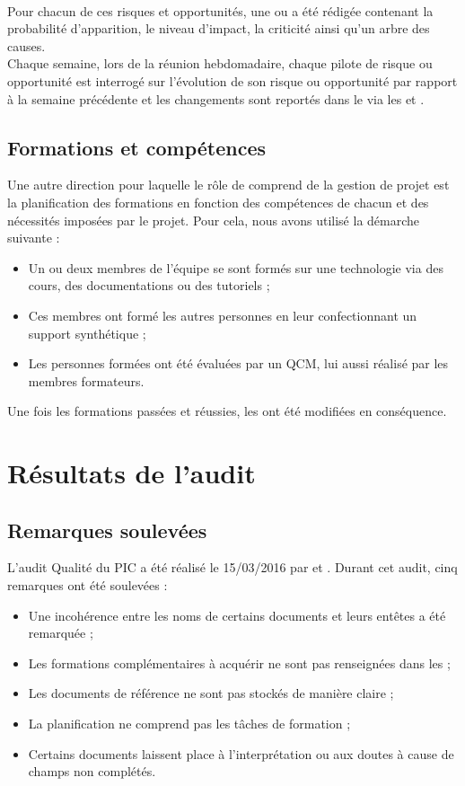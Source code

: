 \documentclass[asi]{picInsa}
\begin{document}
~\\
\indent Pour chacun de ces risques et opportunités, une \FDR{} ou \FDO{} a été rédigée contenant la probabilité d'apparition, le niveau d'impact, la criticité ainsi qu'un arbre des causes. \\
\indent Chaque semaine, lors de la réunion hebdomadaire, chaque pilote de risque ou opportunité est interrogé sur l'évolution de son risque ou opportunité par rapport à la semaine précédente et les changements sont reportés dans le \PRO{} via les \FDR{} et \FDO{}.

\section{Formations et compétences}
Une autre direction pour laquelle le rôle de \RQ{} comprend de la gestion de projet est la planification des formations en fonction des compétences de chacun et des nécessités imposées par le projet. Pour cela, nous avons utilisé la démarche suivante :
\begin{itemize}
\item Un ou deux membres de l’équipe se sont formés sur une technologie via des cours, des documentations ou des tutoriels ;
\item Ces membres ont formé les autres personnes en leur confectionnant un support synthétique ;
\item Les personnes formées ont été évaluées par un QCM, lui aussi réalisé par les membres formateurs.
\end{itemize}
Une fois les formations passées et réussies, les \FC{} ont été modifiées en conséquence.


\chapter{Résultats de l'audit}
\label{Resultats}

\section{Remarques soulevées}
L’audit Qualité du PIC a été réalisé le 15/03/2016 par \nomApprobateur{} et \nomTuteurQualite. Durant cet audit, cinq remarques ont été soulevées :
\begin{itemize}
\item Une incohérence entre les noms de certains documents et leurs entêtes a été remarquée ;
\item Les formations complémentaires à acquérir ne sont pas renseignées dans les \FC{} ;
\item Les documents de référence ne sont pas stockés de manière claire ;
\item La planification ne comprend pas les tâches de formation ;
\item Certains documents laissent place à l'interprétation ou aux doutes à cause de champs non complétés.
\end{itemize}
\end{document}
